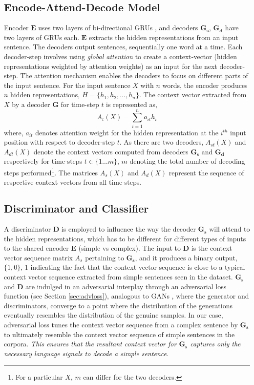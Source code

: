 \documentclass[11pt,a4paper]{article}
\begin{document}
\subsection{Encode-Attend-Decode Model}
\label{sec:enc-dec}
Encoder $\boldsymbol{E}$ uses two layers of bi-directional GRUs \cite{cho2014learning}, and decoders $\boldsymbol{G_s}$, $\boldsymbol{G_d}$ have two layers of GRUs each. $\boldsymbol{E}$ extracts the hidden representations from an input sentence. The decoders output sentences, sequentially one word at a time. Each decoder-step involves using \textit{global attention} to create a context-vector (hidden representations weighted by attention weights) as an input for the next decoder-step. The attention mechanism enables the decoders to focus on different parts of the input sentence. For the input sentence $X$ with $n$ words, the encoder produces $n$ hidden representations, $H=\{h_1,h_2,\ldots,h_n\}$. The context vector extracted from $X$ by a decoder $\boldsymbol{G}$ for time-step $t$ is represented as, 
\begin{equation}
A_t(X) = \sum_{i=1}^n a_{it}h_i
\label{eqn:attention}
\end{equation}
where, $a_{it}$ denotes attention weight for the hidden representation at the $i^{th}$ input position with respect to decoder-step $t$.
As there are two decoders, $A_{st}(X)$ and $A_{dt}(X)$ denote the context vectors computed from decoders $\boldsymbol{G_s}$ and $\boldsymbol{G_d}$ respectively for time-steps $t\in\{1\ldots m\}$, $m$ denoting the total number of decoding steps performed\footnote{For a particular $X$, $m$ can differ for the two decoders.}. The matrices $A_s(X)$ and $A_d(X)$ represent the sequence of respective context vectors from all time-steps.


\subsection{Discriminator and Classifier}
A discriminator $\boldsymbol{D}$ is employed to influence the way the decoder $\boldsymbol{G_s}$ will attend to the hidden representations, which has to be different for different types of inputs to the shared encoder $\boldsymbol{E}$ (simple vs complex). The input to $\boldsymbol{D}$ is the context vector sequence matrix $A_{s}$ pertaining to $\boldsymbol{G_s}$, and it produces a binary output, $\{1,0\}$, $1$ indicating the fact that the context vector sequence is close to a typical context vector sequence extracted from simple sentences seen in the dataset. $\boldsymbol{G_s}$ and $\boldsymbol{D}$ are indulged in an adversarial interplay through an adversarial loss function (see Section \ref{sec:advloss}), analogous to GANs \cite{goodfellow2014generative}, where the generator and discriminators, converge to a point where the distribution of the generations eventually resembles the distribution of the genuine samples. In our case, adversarial loss tunes the context vector sequence from a complex sentence by $\boldsymbol{G_s}$ to ultimately resemble the context vector sequence of simple sentences in the corpora. \emph{This ensures that the resultant context vector for $\boldsymbol{G_s}$ captures only the necessary language signals to decode a simple sentence}.
\end{document}
